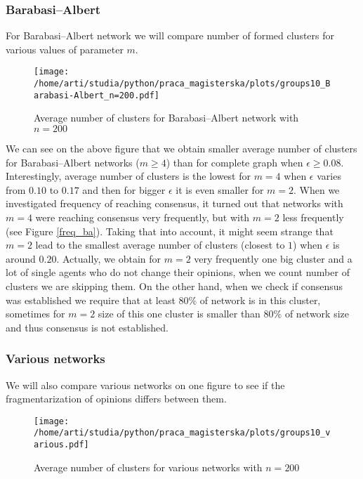 \documentclass{article}
\begin{document}
\subsubsection{Barabasi--Albert}

For Barabasi--Albert network we will compare number of formed clusters for various values of parameter $m$.

\begin{figure}[H]
		\centering
		\texttt{[image: /home/arti/studia/python/praca\_magisterska/plots/groups10\_Barabasi-Albert\_n=200.pdf]}
		\caption{Average number of clusters for Barabasi--Albert network with $n=200$}
\end{figure}

We can see on the above figure that we obtain smaller average number of clusters for Barabasi--Albert networks ($m \geq 4$) than for complete graph when $\epsilon \geq 0.08$. Interestingly, average number of clusters is the lowest for $m=4$ when $\epsilon$ varies from $0.10$ to $0.17$ and then for bigger $\epsilon$ it is even smaller for $m=2$. When we investigated frequency of reaching consensus, it turned out that networks with $m=4$ were reaching consensus very frequently, but with $m=2$ less frequently (see Figure \ref{freq_ba}). Taking that into account, it might seem strange that $m=2$ lead to the smallest average number of clusters (closest to $1$) when $\epsilon$ is around $0.20$. Actually, we obtain for $m=2$ very frequently one big cluster and a lot of single agents who do not change their opinions, when we count number of clusters we are skipping them. On the other hand, when we check if consensus was established we require that at least $80\%$ of network is in this cluster, sometimes for $m=2$ size of this one cluster is smaller than $80\%$ of network size and thus consensus is not established.

\subsubsection{Various networks}

We will also compare various networks on one figure to see if the fragmentarization of opinions differs between them.

\begin{figure}[H]
		\centering
		\texttt{[image: /home/arti/studia/python/praca\_magisterska/plots/groups10\_various.pdf]}
		\caption{Average number of clusters for various networks with $n=200$}
\end{figure}
\end{document}

